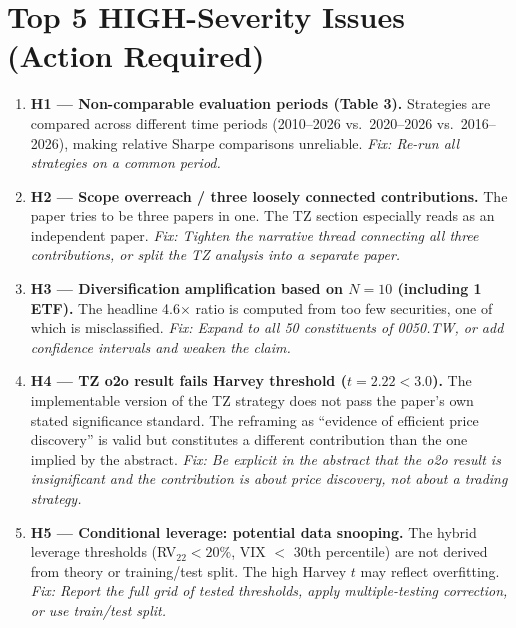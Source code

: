 \documentclass[12pt,a4paper]{article}
\begin{document}
\section{Top 5 HIGH-Severity Issues (Action Required)}

\begin{enumerate}[leftmargin=2em]

\item \textbf{H1 --- Non-comparable evaluation periods (Table 3).} Strategies are compared across different time periods (2010--2026 vs.\ 2020--2026 vs.\ 2016--2026), making relative Sharpe comparisons unreliable. \textit{Fix: Re-run all strategies on a common period.}

\item \textbf{H2 --- Scope overreach / three loosely connected contributions.} The paper tries to be three papers in one. The TZ section especially reads as an independent paper. \textit{Fix: Tighten the narrative thread connecting all three contributions, or split the TZ analysis into a separate paper.}

\item \textbf{H3 --- Diversification amplification based on $N=10$ (including 1 ETF).} The headline 4.6$\times$ ratio is computed from too few securities, one of which is misclassified. \textit{Fix: Expand to all 50 constituents of 0050.TW, or add confidence intervals and weaken the claim.}

\item \textbf{H4 --- TZ o2o result fails Harvey threshold ($t = 2.22 < 3.0$).} The implementable version of the TZ strategy does not pass the paper's own stated significance standard. The reframing as ``evidence of efficient price discovery'' is valid but constitutes a different contribution than the one implied by the abstract. \textit{Fix: Be explicit in the abstract that the o2o result is insignificant and the contribution is about price discovery, not about a trading strategy.}

\item \textbf{H5 --- Conditional leverage: potential data snooping.} The hybrid leverage thresholds (RV$_{22} < 20\%$, VIX $<$ 30th percentile) are not derived from theory or training/test split. The high Harvey $t$ may reflect overfitting. \textit{Fix: Report the full grid of tested thresholds, apply multiple-testing correction, or use train/test split.}

\end{enumerate}
\end{document}
